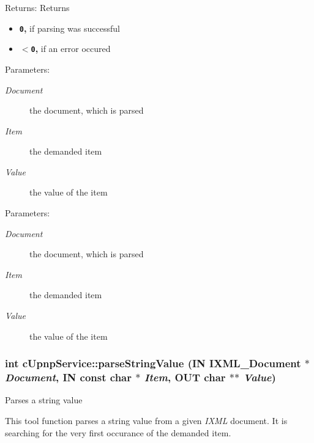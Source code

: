 \begin{Desc}
\item[Returns:]Returns\begin{itemize}
\item {\bf {\tt 0},} if parsing was successful\item {\bf {\tt $<$0},} if an error occured\end{itemize}
\end{Desc}
\begin{Desc}
\item[Parameters:]
\begin{description}
\item[{\em Document}]the document, which is parsed \item[{\em Item}]the demanded item \item[{\em Value}]the value of the item \end{description}
\end{Desc}
\begin{Desc}
\item[Parameters:]
\begin{description}
\item[{\em Document}]the document, which is parsed \item[{\em Item}]the demanded item \item[{\em Value}]the value of the item \end{description}
\end{Desc}
\hypertarget{classcUpnpService_925b7a9628230ce69b803afb8fee212f}{
\subsubsection[{parseStringValue}]{\setlength{\rightskip}{0pt plus 5cm}int cUpnpService::parseStringValue (IN IXML\_\-Document $\ast$ {\em Document}, \/  IN const char $\ast$ {\em Item}, \/  OUT char $\ast$$\ast$ {\em Value})}}
\label{classcUpnpService_925b7a9628230ce69b803afb8fee212f}


Parses a string value

This tool function parses a string value from a given {\em IXML\/} document. It is searching for the very first occurance of the demanded item.

